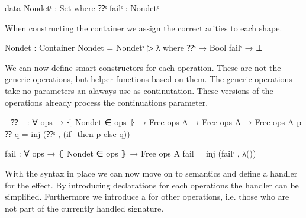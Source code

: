 \begin{code}
data Nondetˢ : Set where ⁇ˢ failˢ : Nondetˢ
\end{code}
When constructing the container we assign the correct arities to each shape.

\begin{code}
Nondet : Container
Nondet = Nondetˢ ▷ λ where
  ⁇ˢ     → Bool
  failˢ  → ⊥
\end{code}
We can now define smart constructors for each operation.
These are not the generic operations, but helper functions based on them.
The generic operations take no parameters an alaways use %
 as continutation.
These versions of the operations already process the continuations parameter.

\begin{code}
_⁇_ : ∀ {ops} → ⦃ Nondet ∈ ops ⦄ → Free ops A → Free ops A → Free ops A
p ⁇ q = inj (⁇ˢ , (if_then p else q))

fail : ∀ {ops} → ⦃ Nondet ∈ ops ⦄ → Free ops A
fail = inj (failˢ , λ())
\end{code}
With the syntax in place we can now move on to semantics and define a handler
for the effect.
By introducing  declarations for each operations the
handler can be simplified.
Furthermore we introduce a  for other operations, i.e.
those who are not part of the currently handled signature.

